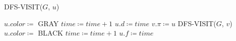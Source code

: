 \begin{algorithm}[t] 
    \caption{DFS-VISIT($G$, $u$)}\label{alg:dfs-visit}
    \begin{algorithmic}[1]
        \State $u.color \coloneqq$ GRAY
        \State $time \coloneqq time + 1$
        \State $u.d \coloneqq time$
                \State $v.\pi \coloneqq u$
                \State DFS-VISIT($G$, $v$)
            \EndIf
        \EndFor
        \State $u.color \coloneqq$ BLACK
        \State $time \coloneqq time + 1$
        \State $u.f \coloneqq time$
    \end{algorithmic}
\end{algorithm}
